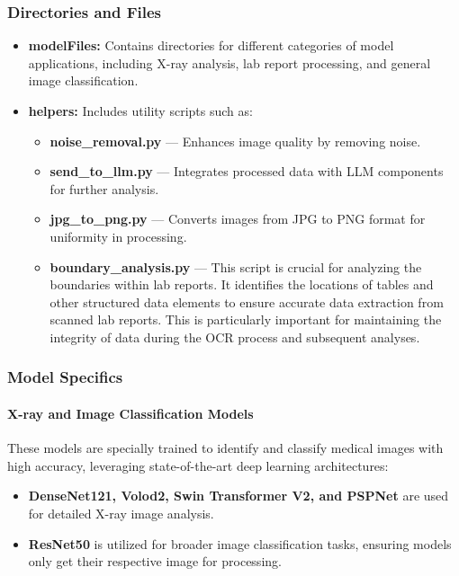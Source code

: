 \subsubsection{Directories and Files}
\begin{itemize}
    \item \textbf{modelFiles:} Contains directories for different categories of model applications, including X-ray analysis, lab report processing, and general image classification.
    \item \textbf{helpers:} Includes utility scripts such as:
        \begin{itemize}
            \item \textbf{noise\_removal.py} — Enhances image quality by removing noise.
            \item \textbf{send\_to\_llm.py} — Integrates processed data with LLM components for further analysis.
            \item \textbf{jpg\_to\_png.py} — Converts images from JPG to PNG format for uniformity in processing.
            \item \textbf{boundary\_analysis.py} — This script is crucial for analyzing the boundaries within lab reports. It identifies the locations of tables and other structured data elements to ensure accurate data extraction from scanned lab reports. This is particularly important for maintaining the integrity of data during the OCR process and subsequent analyses.
        \end{itemize}
\end{itemize}

\subsubsection{Model Specifics}
\paragraph{X-ray and Image Classification Models}
These models are specially trained to identify and classify medical images with high accuracy, leveraging state-of-the-art deep learning architectures:
\begin{itemize}
    \item \textbf{DenseNet121, Volod2, Swin Transformer V2, and PSPNet} are used for detailed X-ray image analysis.
    \item \textbf{ResNet50} is utilized for broader image classification tasks, ensuring models only get their respective image for processing.
\end{itemize}

